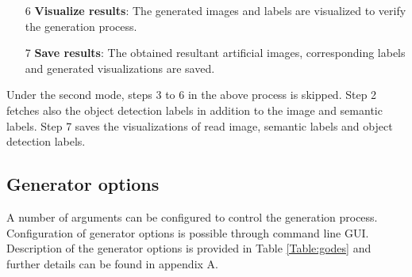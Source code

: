\begin{itemize}
		\item[6] \textbf{Visualize results}: The generated images and labels are visualized to verify the generation process.
		\item[7] \textbf{Save results}: The obtained resultant artificial images, corresponding labels and generated visualizations are saved.
	\end{itemize}
	
Under the second mode, steps 3 to 6 in the above process is skipped. Step 2 fetches also the object detection labels in addition to the image and semantic labels. Step 7 saves the visualizations of read image, semantic labels and object detection labels.
		

\subsection{Generator options}

A number of arguments can be configured to control the generation process. Configuration of generator options is possible through command line GUI. Description of the generator options is provided in Table \ref{Table:godes} and further details can be found in appendix A.

